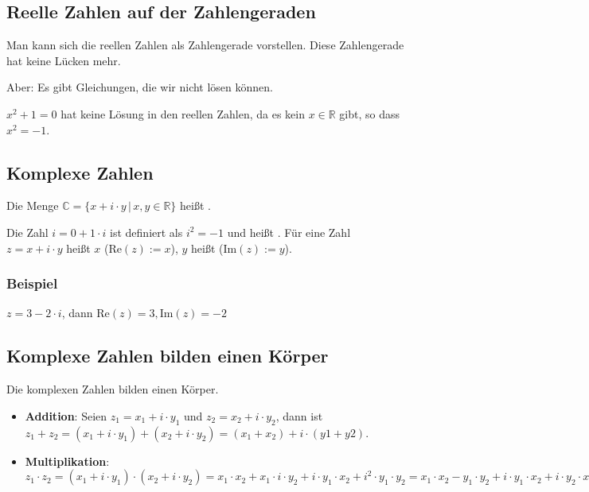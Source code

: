 \subsection{Reelle Zahlen auf der Zahlengeraden}
Man kann sich die reellen Zahlen als Zahlengerade vorstellen. Diese Zahlengerade hat keine Lücken mehr.

\begin{center}
\end{center}

Aber: Es gibt Gleichungen, die wir nicht lösen können.

$x^2 + 1 = 0$ hat keine Lösung in den reellen Zahlen, da es kein $x \in \mathbb{R}$ gibt, so dass $x^2 = -1$.

\subsection{Komplexe Zahlen}
Die Menge $\mathbb{C} = \{x + i\cdot y\,|\,x, y \in \mathbb{R}\}$ heißt .

Die Zahl $i = 0 + 1\cdot i$ ist definiert als $i^2 = -1$ und heißt . Für eine Zahl $z = x + i\cdot y$ heißt $x$  ($\text{Re}(z) := x$), $y$ heißt  ($\text{Im}(z) := y$).

\subsubsection{Beispiel}
$z = 3 - 2\cdot i$, dann $\text{Re}(z) = 3, \text{Im}(z) = -2$

\subsection{Komplexe Zahlen bilden einen Körper}
Die komplexen Zahlen bilden einen Körper.

\begin{itemize}
\item{\textbf{Addition}: Seien $z_1 = x_1 + i \cdot y_1$ und $z_2 = x_2 + i \cdot y_2$, dann ist $z_1 + z_2 = (x_1 + i \cdot y_1) + (x_2 + i \cdot y_2) = (x_1 + x_2) + i \cdot (y1 + y2)$.}
\item{\textbf{Multiplikation}: $z_1 \cdot z_2 = (x_1 + i \cdot y_1) \cdot (x_2 + i \cdot y_2) = x_1 \cdot x_2 + x_1 \cdot i \cdot y_2 + i \cdot y_1 \cdot x_2 + i^2 \cdot y_1 \cdot y_2 = x_1 \cdot x_2 - y_1 \cdot y_2 + i \cdot y_1 \cdot x_2 + i \cdot y_2 \cdot x_1 = (x_1 \cdot x_2 - y_1 \cdot y_2) + i \cdot (x_1 \cdot y_2 + x_2 \cdot y_1)$}
\end{itemize}

